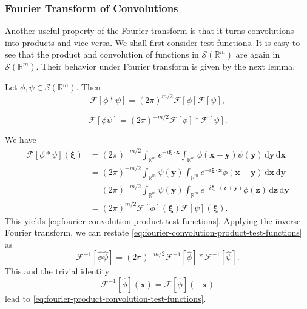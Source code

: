 \subsubsection{Fourier Transform of Convolutions}\label{subsec:fourier-convolutions}

Another useful property of the Fourier transform is that it turns convolutions into products and vice versa. We shall first consider test functions. It is easy to see that the product and convolution of functions in $\mathcal{S}(\mathbb{R}^m)$ are again in $\mathcal{S}(\mathbb{R}^m)$. Their behavior under Fourier transform is given by the next lemma.

\begin{Lemma}
\label{lem:fourier-convolution-test-functions}
Let $\phi,\psi\in\mathcal{S}(\mathbb{R}^m)$. Then
\begin{equation}\label{eq:fourier-convolution-product-test-functions}
\mathcal{F}[\phi*\psi]=(2\pi)^{m/2}\mathcal{F}[\phi]\mathcal{F}[\psi],
\end{equation}

\begin{equation}\label{eq:fourier-product-convolution-test-functions}
\mathcal{F}[\phi\psi]=(2\pi)^{-m/2}\mathcal{F}[\phi]*\mathcal{F}[\psi].
\end{equation}

\end{Lemma}

\begin{Proof}
We have
\begin{equation}\label{eq:fourier-convolution-test-functions-proof}
\begin{aligned}
\mathcal{F}[\phi*\psi](\bm{\xi})
&=(2\pi)^{-m/2}\int_{\mathbb{R}^m}e^{-i\bm{\xi}\cdot\bm{x}}\int_{\mathbb{R}^m}\phi(\bm{x}-\bm{y})\psi(\bm{y})\,\mathrm{d}\bm{y}\,\mathrm{d}\bm{x}\\
&=(2\pi)^{-m/2}\int_{\mathbb{R}^m}\psi(\bm{y})\int_{\mathbb{R}^m}e^{-i\bm{\xi}\cdot\bm{x}}\phi(\bm{x}-\bm{y})\,\mathrm{d}\bm{x}\,\mathrm{d}\bm{y}\\
&=(2\pi)^{-m/2}\int_{\mathbb{R}^m}\psi(\bm{y})\int_{\mathbb{R}^m}e^{-i\bm{\xi}\cdot(\bm{z}+\bm{y})}\phi(\bm{z})\,\mathrm{d}\bm{z}\,\mathrm{d}\bm{y}\\
&=(2\pi)^{m/2}\mathcal{F}[\phi](\bm{\xi})\mathcal{F}[\psi](\bm{\xi}).
\end{aligned}
\end{equation}
This yields \eqref{eq:fourier-convolution-product-test-functions}. Applying the inverse Fourier transform, we can restate \eqref{eq:fourier-convolution-product-test-functions} as
\begin{equation}\label{eq:inverse-fourier-product-convolution}
\mathcal{F}^{-1}[\widehat\phi\widehat\psi]=(2\pi)^{-m/2}\mathcal{F}^{-1}[\widehat\phi]*\mathcal{F}^{-1}[\widehat\psi].
\end{equation}
This and the trivial identity
\begin{equation}\label{eq:inverse-fourier-forward-reflection}
\mathcal{F}^{-1}[\widehat\phi](\bm{x})=\mathcal{F}[\widehat\phi](-\bm{x})
\end{equation}
lead to \eqref{eq:fourier-product-convolution-test-functions}.
\end{Proof}

